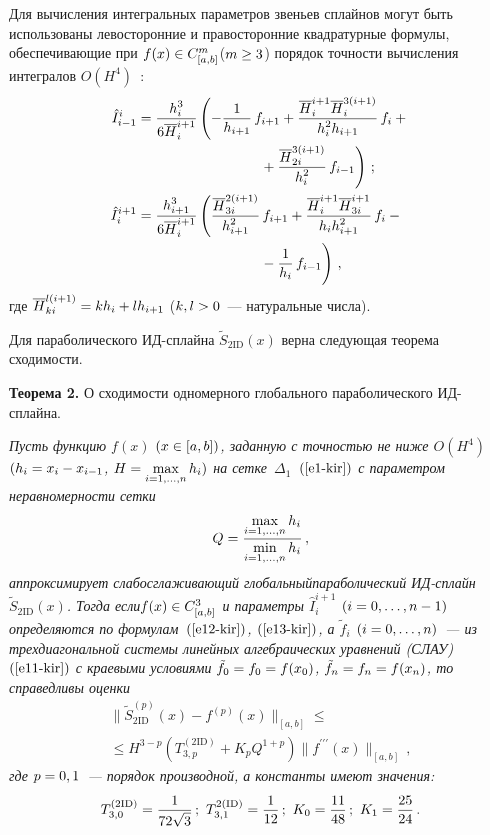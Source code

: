 \begin{multicols}{2}
  Для вычисления интегральных параметров звень\-ев сплайнов могут быть 
использованы левосторонние и правосторонние квадратурные формулы, 
обеспечивающие при $f(x)\hm\in C^m_{[a,b]}$\linebreak ($m\hm\geq3$) порядок 
точности вычисления интегралов $O(H^4)$~\cite{8-kir}: 
  \begin{align}
  \hat{I}_{i-1}^i &= \fr{h_i^3}{6\overline{H}_i^{i+1}}\left(  -
\fr{1}{h_{i+1}}\,f_{i+1} +\fr{\overline{H}_i^{i+1}\overline{H}_i^{3(i+1)}} 
{h_i^2 h_{i+1}}\,f_i +{}\right.\notag\\
&\hspace*{30mm}\left.{}+\fr{\overline{H}_{2i}^{3(i+1)}}{h_i^2}\,f_{i-1}\right)\,; 
\label{e12-kir}\\
  \hat{I}_i^{i+1} &= \fr{h^3_{i+1}}{6\overline{H}_i^{i+1}}\left(  
\fr{\overline{H}_{3i}^{2(i+1)}}{h^2_{i+1}}\,f_{i+1} + \fr{\overline{H}_i^{i+1} 
\overline{H}_{3i}^{i+1}} {h_i h^2_{i+1}}\,f_i -{}\right.\notag\\
&\hspace*{30mm}\left.{}-\fr{1}{h_i}\,f_{i- 1}
\vphantom{ \fr{\overline{H}_i^{i+1} 
\overline{H}_{3i}^{i+1}} {h_i h^2_{i+1}}}
\right)\,,\label{e13-kir}
  \end{align}
где $\overline{H}_{ki}^{l(i+1)} \hm= kh_i\hm+lh_{i+1}$ ($k, l\hm>0$~--- 
натуральные числа).
  
  Для параболического ИД-сплай\-на $\tilde{S}_{2\mathrm{ID}}(x)$ верна следующая 
теорема сходимости. 
  
  \medskip
  
  \noindent
\textbf{Теорема 2.} {О сходимости одномерного глобального 
параболического ИД-сплай\-на.}

  \textit{Пусть функцию $f(x)$ $(x\hm\in [a,b])$, заданную с точностью не ниже 
$O(H^4)$ $(h_i\hm=x_i\hm-x_{i-1}$, $H\hm= \max\limits_{i=1,\ldots ,n} h_i)$ на 
сетке~$\Delta_1$~$(\ref{e1-kir})$ с параметром неравномерности сетки 
$$
Q= \displaystyle\frac{\displaystyle \max\limits_{i=1,\ldots , n} h_i \mathstrut}{\displaystyle \min\limits_{i=1,\ldots ,n} h_i\mathstrut}\,,
$$
 аппроксимирует 
слабосглаживающий глобальный\linebreak параболический ИД-сплайн 
$\tilde{S}_{2\mathrm{ID}}(x)$. Тогда если\linebreak $f(x)\hm\in C^3_{[a,b]}$ и параметры 
$\hat{I}_i^{i+1}$ $(i\hm=0,\ldots , n-1)$ определяются по формулам~$(\ref{e12-kir})$, 
$(\ref{e13-kir})$, а $\tilde{f}_i$ $(i\hm=0,\ldots ,n)$~--- из трехдиагональной 
системы линейных алгебраических уравнений (СЛАУ)~$(\ref{e11-kir})$ с 
краевыми условиями $\tilde{f}_0\hm= f_0\hm= f(x_0)$, $\tilde{f}_n\hm= 
f_n\hm= f(x_n)$, то справедливы оценки}
  \begin{multline}
  \parallel \!\tilde{S}^{(p)}_{2\mathrm{ID}}(x)-f^{(p)}(x)\!\parallel_{[a,b]} \leq {}\\
  {}\leq H^{3-p}\left( 
T_{3,p}^{(2\mathrm{ID})} +K_p Q^{1+p}\right) \parallel \!
f^{\prime\prime\prime}(x)\!\parallel_{[a,b]}\,,
  \label{e14-kir}
  \end{multline}
\textit{где $p\hm=0,1$~--- порядок производной, а константы имеют значения: }
$$
T^{(2\mathrm{ID})}_{3,0}=\displaystyle\frac{\displaystyle 1\mathstrut}{\displaystyle 72\sqrt{3}\mathstrut}\,;\  T^{2\mathrm{(ID)}}_{3,1}=\displaystyle\frac{\displaystyle 1\mathstrut}{\displaystyle 12\mathstrut}\,;\  
K_0=\displaystyle\frac{\displaystyle 11\mathstrut}{\displaystyle 48\mathstrut}\,;\  K_1=\displaystyle\frac{\displaystyle 25\mathstrut}{\displaystyle 24\mathstrut}\,.
$$
  

\end{multicols}
